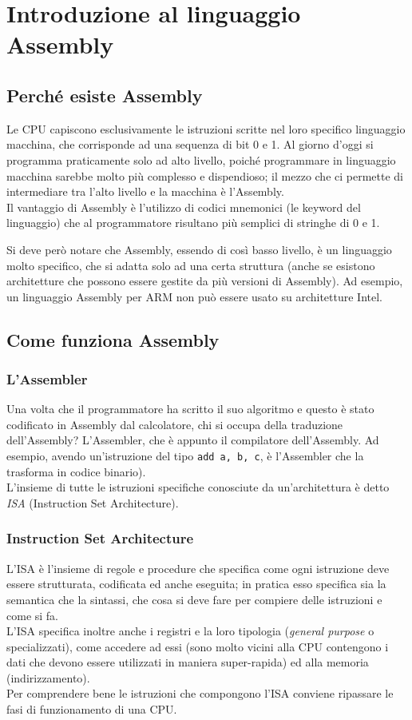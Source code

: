 \documentclass[class=book, crop=false, oneside]{standalone}
\begin{document}
\chapter{Introduzione al linguaggio Assembly}

\section{Perché esiste Assembly}

Le CPU capiscono esclusivamente le istruzioni scritte nel loro specifico linguaggio macchina, che corrisponde ad una sequenza di bit 0 e 1.
Al giorno d'oggi si programma praticamente solo ad alto livello, poiché programmare in linguaggio macchina sarebbe molto più complesso e dispendioso; il mezzo che ci permette di intermediare tra l'alto livello e la macchina è l’Assembly.\\
Il vantaggio di Assembly è l'utilizzo di codici mnemonici (le keyword del linguaggio) che al programmatore risultano più semplici di stringhe di 0 e 1.

Si deve però notare che Assembly, essendo di così basso livello, è un linguaggio molto specifico, che si adatta solo ad una certa struttura (anche se esistono architetture che possono essere gestite da più versioni di Assembly). Ad esempio, un linguaggio Assembly per ARM non può essere usato su architetture Intel.

\section{Come funziona Assembly}

\subsection{L'Assembler}
Una volta che il programmatore ha scritto il suo algoritmo e questo è stato codificato in Assembly dal calcolatore, chi si occupa della traduzione dell’Assembly? L’Assembler, che è appunto il compilatore dell’Assembly. Ad esempio, avendo un'istruzione del tipo \texttt{add a, b, c}, è l’Assembler che la trasforma in codice binario).\\
L’insieme di tutte le istruzioni specifiche conosciute da un’architettura è detto \emph{ISA} (Instruction Set Architecture).

\subsection{Instruction Set Architecture}
L’ISA è l'insieme di regole e procedure che specifica come ogni istruzione deve essere strutturata, codificata ed anche eseguita; in pratica esso specifica sia la semantica che la sintassi, che cosa si deve fare per compiere delle istruzioni e come si fa.\\
L’ISA specifica inoltre anche i registri e la loro tipologia (\emph{general purpose} o specializzati), come accedere ad essi (sono molto vicini alla CPU contengono i dati che devono essere utilizzati in maniera super-rapida) ed alla memoria (indirizzamento).\\
Per comprendere bene le istruzioni che compongono l'ISA conviene ripassare le fasi di funzionamento di una CPU.
\end{document}
